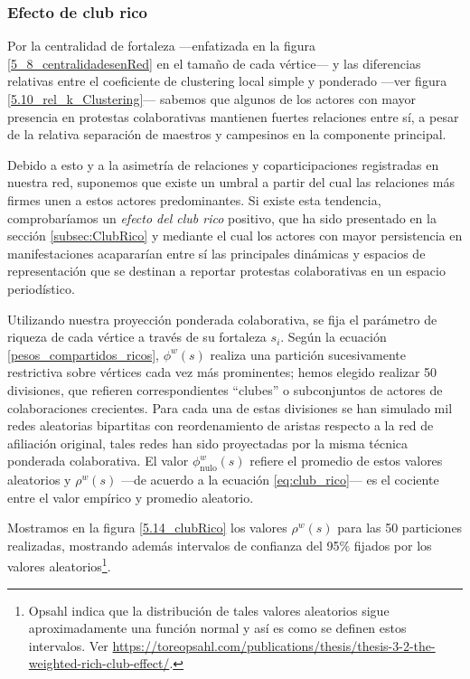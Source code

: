\documentclass[letterpaper, 11pt]{book}
\theoremstyle{definition}
\theoremstyle{remark}
\begin{document}
\subsubsection{Efecto de club rico}
\label{subsubsec:homofiliaClub__proyec}

Por la centralidad de fortaleza ---enfatizada en la figura \ref{5_8_centralidadesenRed} en el tamaño de cada vértice--- y las diferencias relativas entre el coeficiente de clustering local simple y ponderado ---ver figura \ref{5.10_rel_k_Clustering}--- sabemos que algunos de los actores con mayor presencia en protestas colaborativas mantienen fuertes relaciones entre sí, a pesar de la relativa separación de maestros y campesinos en la componente principal. 


Debido a esto y a la asimetría de relaciones y coparticipaciones registradas en nuestra red, suponemos que existe un umbral a partir del cual las relaciones más firmes unen a estos actores predominantes. 
Si existe esta tendencia, comprobaríamos un \emph{efecto del club rico} positivo, que ha sido presentado en la sección \ref{subsec:ClubRico} y mediante el cual los actores con mayor persistencia en manifestaciones acapararían entre sí las principales dinámicas y espacios de representación que se destinan a reportar protestas colaborativas en un espacio periodístico. 


Utilizando nuestra proyección ponderada colaborativa, se fija el parámetro de riqueza de cada vértice a través de su fortaleza $s_i$. 
Según la ecuación \ref{pesos_compartidos_ricos}, $\phi^{w}(s)$ realiza una partición sucesivamente restrictiva sobre vértices cada vez más prominentes; hemos elegido realizar 50 divisiones, que refieren correspondientes ``clubes'' o subconjuntos de actores de colaboraciones crecientes. 
Para cada una de estas divisiones se han simulado mil redes aleatorias bipartitas con reordenamiento de aristas respecto a la red de afiliación original, tales redes han sido proyectadas por la misma técnica ponderada colaborativa. 
El valor $\phi^{w}_{\text{nulo}}(s)$ refiere el promedio de estos valores aleatorios y $\rho^{w}(s)$ ---de acuerdo a la ecuación \ref{eq:club_rico}--- es el cociente entre el valor empírico y promedio aleatorio. 


Mostramos en la figura \ref{5.14_clubRico} los valores $\rho^{w}(s)$ para las 50 particiones realizadas, mostrando además intervalos de confianza del 95\% fijados por los valores aleatorios\footnote{
    Opsahl indica que la distribución de tales valores aleatorios sigue aproximadamente una función normal y así es como se definen estos intervalos.  
    Ver \url{https://toreopsahl.com/publications/thesis/thesis-3-2-the-weighted-rich-club-effect/}.
}. 
\end{document}
